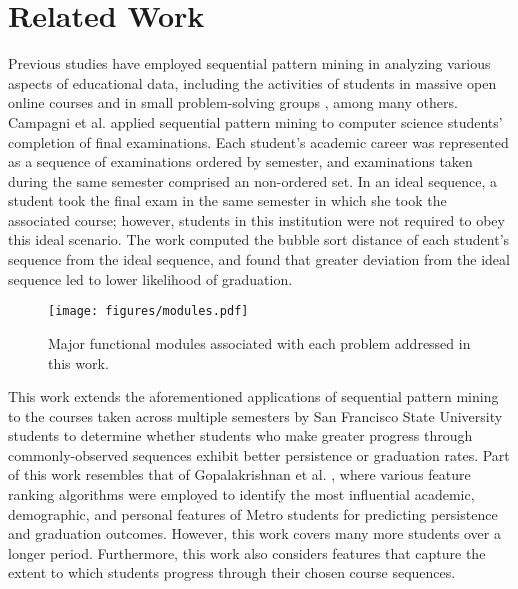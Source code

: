 \documentclass[conference]{IEEEtran}
\begin{document}
\section{Related Work}

Previous studies have employed sequential pattern mining \cite{Agrawal} in analyzing various aspects of educational data, including the activities of students in massive open online courses \cite{Munk} and in small problem-solving groups \cite{Perera}, among many others.  %
Campagni et al. \cite{Campagni} applied sequential pattern mining to computer science students' completion of final examinations.  Each student's academic career was represented as a sequence of examinations ordered by semester, and examinations taken during the same semester comprised an non-ordered set.  In an ideal sequence, a student took the final exam in the same semester in which she took the associated course; however, students in this institution were not required to obey this ideal scenario. The work computed the bubble sort distance of each student's sequence from the ideal sequence, and found that greater deviation from the ideal sequence led to lower likelihood of graduation.

\begin{figure*}[htbp]
\centering
\texttt{[image: figures/modules.pdf]}
\caption{Major functional modules associated with each problem addressed in this work.}
\label{modules}
\end{figure*}

This work extends the aforementioned applications of sequential pattern mining to the courses taken across multiple semesters by San Francisco State University students to determine whether students who make greater progress through commonly-observed sequences exhibit better persistence or graduation rates.  Part of this work resembles that of Gopalakrishnan et al. \cite{Gopalakrishnan}, where various feature ranking algorithms were employed to identify the most influential academic, demographic, and personal features of Metro students for predicting persistence and graduation outcomes.  However, this work covers many more students over a longer period. Furthermore, this work also considers features that capture the extent to which students progress through their chosen course sequences.
\end{document}
